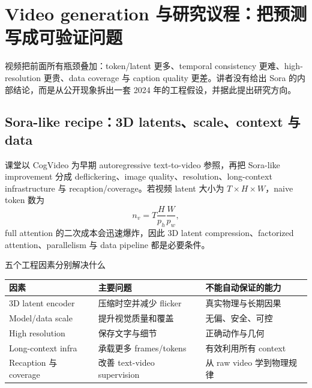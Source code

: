 \section{Video generation 与研究议程：把预测写成可验证问题}

视频把前面所有瓶颈叠加：token/latent 更多、temporal consistency 更难、high-resolution 更贵、data coverage 与 caption quality 更差。讲者没有给出 Sora 的内部结论，而是从公开现象拆出一套 2024 年的工程假设，并据此提出研究方向。

\subsection{Sora-like recipe：3D latents、scale、context 与 data}

课堂以 CogVideo 为早期 autoregressive text-to-video 参照，再把 Sora-like improvement 分成 deflickering、image quality、resolution、long-context infrastructure 与 recaption/coverage。若视频 latent 大小为 $T\times H\times W$，naive token 数为
\[
n_v=T\frac{H}{p_h}\frac{W}{p_w},
\]
full attention 的二次成本会迅速爆炸，因此 3D latent compression、factorized attention、parallelism 与 data pipeline 都是必要条件。


\begin{knowledgebox}{五个工程因素分别解决什么}
\small\sloppy
\begin{tabularx}{\textwidth}{L{0.19\textwidth} L{0.32\textwidth} X}
\toprule
因素 & 主要问题 & 不能自动保证的能力 \\
\midrule
3D latent encoder & 压缩时空并减少 flicker & 真实物理与长期因果 \\
Model/data scale & 提升视觉质量和覆盖 & 无偏、安全、可控 \\
High resolution & 保存文字与细节 & 正确动作与几何 \\
Long-context infra & 承载更多 frames/tokens & 有效利用所有 context \\
Recaption 与 coverage & 改善 text-video supervision & 从 raw video 学到物理规律 \\
\bottomrule
\end{tabularx}
\end{knowledgebox}


